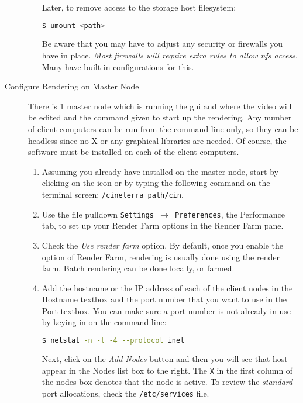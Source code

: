 \begin{description}
\begin{enumerate}
        Later, to remove access to the storage host filesystem:        
        \begin{lstlisting}[language=bash,numbers=none]
$ umount <path>
        \end{lstlisting}
        
        Be aware that you may have to adjust any security or firewalls you have in place.  \textit{Most firewalls will require extra rules to allow nfs access}.  Many have built-in configurations for this. 
    \end{enumerate}
    \item[Configure Rendering on Master Node] There is 1 master node which is running the \CGG{} gui and where the video will be edited and the command given to start up the rendering.  Any number of client computers can be run from the command line only, so they can be headless since no X or any graphical libraries are needed.  Of course, the \CGG{} software must be installed on each of the client computers.
    \begin{enumerate}
        \item Assuming you already have \CGG{} installed on the master node, start \CGG{} by clicking on the
        icon or by typing the following command on the terminal screen:  \texttt{/{cinelerra\_path}/cin}.
        \item Use the file pulldown \texttt{Settings $\rightarrow$ Preferences}, the Performance tab, to set up your Render Farm
        options in the Render Farm pane.
        \item Check the \textit{Use render farm} option.  By default, once you enable the option of Render Farm, rendering is usually done using the render farm.  Batch rendering can be done locally, or farmed.
        \item Add the hostname or the IP address of each of the client nodes in the Hostname textbox and the port
        number that you want to use in the Port textbox.  You can make sure a port number is not already in
        use by keying in on the command line:
        \begin{lstlisting}[language=bash,numbers=none]
$ netstat -n -l -4 --protocol inet
        \end{lstlisting}
        Next, click on the \textit{Add Nodes}
        button and then you will see that host appear in the Nodes list box to the right.  The \texttt{X} in the first
        column of the nodes box denotes that the node is active.  To review the \textit{standard} port allocations,
        check the \texttt{/etc/services} file.

\end{enumerate}
\end{description}
